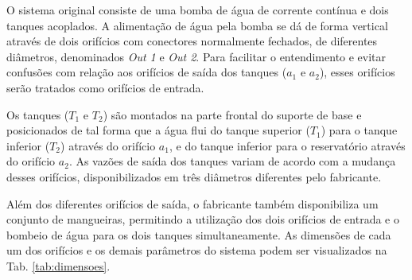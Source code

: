 O sistema original consiste de uma bomba de água de corrente contínua e dois
tanques acoplados. A alimentação de água pela bomba se dá de forma vertical
através de dois orifícios com conectores normalmente fechados, de diferentes
diâmetros, denominados {\it Out 1} e {\it Out 2}. Para facilitar o entendimento
e evitar confusões com relação aos orifícios de saída dos tanques ($a_1$ e
$a_2$), esses orifícios serão tratados como orifícios de entrada.


Os tanques ($T_1$ e $T_2$) são montados na parte frontal do suporte de base e
posicionados de tal forma que a água flui do tanque superior ($T_1$) para o
tanque inferior ($T_2$) através do orifício $a_1$, e do tanque inferior para o
reservatório através do orifício $a_2$. As vazões de saída dos tanques variam de
acordo com a mudança desses orifícios, disponibilizados em três diâmetros
diferentes pelo fabricante.


Além dos diferentes orifícios de saída, o fabricante também disponibiliza um
conjunto de mangueiras, permitindo a utilização dos dois orifícios de entrada e
o bombeio de água para os dois tanques simultaneamente. As dimensões de cada um
dos orifícios e os demais parâmetros do sistema podem ser visualizados na Tab.
\ref{tab:dimensoes}.

